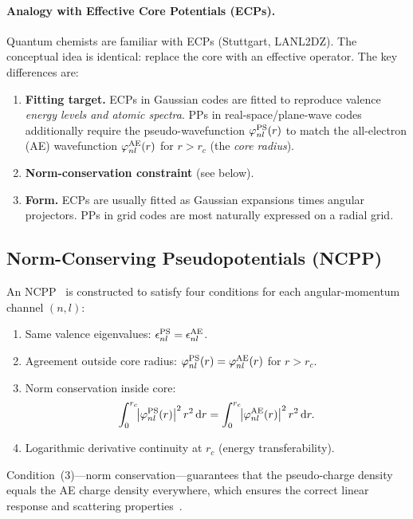 \documentclass[12pt,letterpaper]{article}
\newcommand{\dd}{\mathrm{d}}
\newcommand{\psiPS}{\varphi^{\rm PS}}
\newcommand{\psiAE}{\varphi^{\rm AE}}
\begin{document}
\paragraph{Analogy with Effective Core Potentials (ECPs).}
Quantum chemists are familiar with ECPs (Stuttgart, LANL2DZ).  The conceptual
idea is identical: replace the core with an effective operator.  The key
differences are:
\begin{enumerate}[label=(\roman*)]
  \item \textbf{Fitting target.}  ECPs in Gaussian codes are fitted to
    reproduce valence \emph{energy levels and atomic spectra}.  PPs in
    real-space/plane-wave codes additionally require the pseudo-wavefunction
    $\psiPS_{nl}(r)$ to match the all-electron (AE) wavefunction
    $\psiAE_{nl}(r)$ for $r > r_c$ (the \emph{core radius}).
  \item \textbf{Norm-conservation constraint} (see below).
  \item \textbf{Form.}  ECPs are usually fitted as Gaussian expansions times
    angular projectors.  PPs in grid codes are most naturally expressed on a
    radial grid.
\end{enumerate}

\subsection{Norm-Conserving Pseudopotentials (NCPP)}
\label{sec:pp:ncpp}

An NCPP~\cite{Hamann1979,Troullier1991} is constructed to satisfy four
conditions for each angular-momentum channel $(n,l)$:
\begin{enumerate}[label=(\arabic*)]
  \item Same valence eigenvalues:
    $\epsilon^{\rm PS}_{nl} = \epsilon^{\rm AE}_{nl}$.
  \item Agreement outside core radius:
    $\psiPS_{nl}(r) = \psiAE_{nl}(r)$ for $r > r_c$.
  \item Norm conservation inside core:
    \begin{equation}
      \int_0^{r_c}\!\!\left|\psiPS_{nl}(r)\right|^2 r^2\,\dd r
      = \int_0^{r_c}\!\!\left|\psiAE_{nl}(r)\right|^2 r^2\,\dd r.
      \label{eq:norm_conservation}
    \end{equation}
  \item Logarithmic derivative continuity at $r_c$ (energy transferability).
\end{enumerate}
Condition~(3)---norm conservation---guarantees that the pseudo-charge density
equals the AE charge density everywhere, which ensures the correct linear
response and scattering properties~\cite{Hamann1979}.
\end{document}
